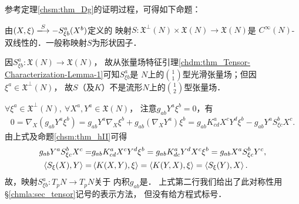 参考定理\ref{chsm:thm_Dg}的证明过程，可得如下命题：
\begin{proposition}\label{chsm:thm_Swein}
    由$(X,\xi)\xlongrightarrow{S}- S^a_{\xi b}(X^b)$定义的
    映射$S:\mathfrak{X}^\bot(N)\times \mathfrak{X}(N) \to \mathfrak{X}(N)$是
    $C^\infty(N)$-双线性的．一般称映射$S$为{\heiti 形状因子}．
\end{proposition}
因$S^a_{\xi b} : \mathfrak{X}(N) \to \mathfrak{X}(N)$，
故从张量场特征引理\ref{chdm:thm_Tensor-Characterization-Lemma-1}可知$S^a_{\xi b}$是
$N$上的$\binom{1}{1}$型光滑张量场；但因$\xi^a \in \mathfrak{X}^\bot (N)$，
故$S$（及$K$）不是流形$N$上的$\binom{1}{2}$型张量场．


$\forall \xi^a \in \mathfrak{X}^\bot(N),
\ \forall X^a, Y^a \in \mathfrak{X}(N)$，
注意${g}_{ab} Y^a \xi^b=0$，有
\begin{align*}
    0={\nabla}_{X} ({g}_{ab} Y^a \xi^b)=
    {g}_{ab} Y^a {\nabla}_{X} \xi^b+
    {g}_{ab} ({\nabla}_{X}  Y^a ) \xi^b
    ={g}_{ab} K^a_{cd} X^c Y^d \xi^b
    -{g}_{ab} Y^a S^b_{\xi c} X^c .
\end{align*}
由上式及命题{\ref{chsm:thm_hII}}可得
\begin{align}
    {g}_{ab} Y^a  S^b_{\xi c} X^c= &
    {g}_{ab} K^a_{cd} X^c Y^d \xi^b
    ={g}_{ab} K^a_{dc}  Y^d X^c \xi^b
    ={g}_{ab} X^a S^b_{\xi c} Y^c , \label{chsm:eqn_sym-Sh}\\
   \left< S_{\xi}(X), Y \right>
   =& \left< K(X,Y), \xi \right>
   = \left< K(Y,X), \xi \right>
   =\left< S_{\xi}(Y),X \right>  . \notag 
\end{align}
故，映射$S^a_{\xi b}:T_pN \to T_pN$关于
内积${g}_{ab}$是．
上式第二行我们给出了此对称性用\S \ref{chmla:sec_tensor}记号的表示方法，
但没有给方程式标号．


